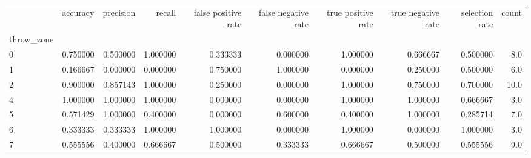\begin{tabular}{lrrrrrrrrr}
\toprule
{} &  accuracy &  precision &    recall &  false positive rate &  false negative rate &  true positive rate &  true negative rate &  selection rate &  count \\
throw\_zone &           &            &           &                      &                      &                     &                     &                 &        \\
\midrule
0          &  0.750000 &   0.500000 &  1.000000 &             0.333333 &             0.000000 &            1.000000 &            0.666667 &        0.500000 &    8.0 \\
1          &  0.166667 &   0.000000 &  0.000000 &             0.750000 &             1.000000 &            0.000000 &            0.250000 &        0.500000 &    6.0 \\
2          &  0.900000 &   0.857143 &  1.000000 &             0.250000 &             0.000000 &            1.000000 &            0.750000 &        0.700000 &   10.0 \\
4          &  1.000000 &   1.000000 &  1.000000 &             0.000000 &             0.000000 &            1.000000 &            1.000000 &        0.666667 &    3.0 \\
5          &  0.571429 &   1.000000 &  0.400000 &             0.000000 &             0.600000 &            0.400000 &            1.000000 &        0.285714 &    7.0 \\
6          &  0.333333 &   0.333333 &  1.000000 &             1.000000 &             0.000000 &            1.000000 &            0.000000 &        1.000000 &    3.0 \\
7          &  0.555556 &   0.400000 &  0.666667 &             0.500000 &             0.333333 &            0.666667 &            0.500000 &        0.555556 &    9.0 \\
\bottomrule
\end{tabular}
